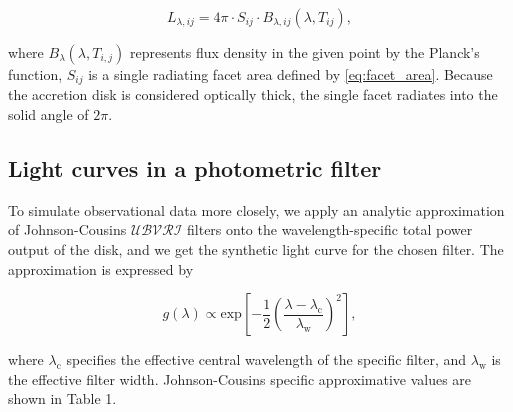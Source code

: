 \begin{equation}
	L_{\lambda,ij} = 4\pi \cdot S_{ij} \cdot B_{\lambda,ij}(\lambda, T_{ij}),
	\label{eq:facet_radiation}
\end{equation}

where $B_{\lambda}(\lambda, T_{i,j})$ represents flux density in the given point by the Planck's function, $S_{ij}$ is a single radiating facet area defined by \eqref{eq:facet_area}. Because the accretion disk is considered optically thick, the single facet radiates into the solid angle of $2\pi$. 


%

\subsection{Light curves in a photometric filter}

To simulate observational data more closely, we apply an analytic approximation of Johnson-Cousins $\mathcal{UBVRI}$ filters onto the wavelength-specific total power output of the disk, and we get the synthetic light curve for the chosen filter. The approximation is expressed by

\begin{equation}
g(\lambda) \propto \text{exp}\left[ - \frac{1}{2} \left( \frac{\lambda - \lambda_{\text{c}}}{\lambda_{\mathrm{w}}} \right)^2 \right],
\label{eq:filter_gauss}
\end{equation}

where $\lambda_{\mathrm{c}}$ specifies the effective central wavelength of the specific filter, and $\lambda_{\mathrm{w}}$ is the effective filter width. Johnson-Cousins specific approximative values are shown in Table 1.

